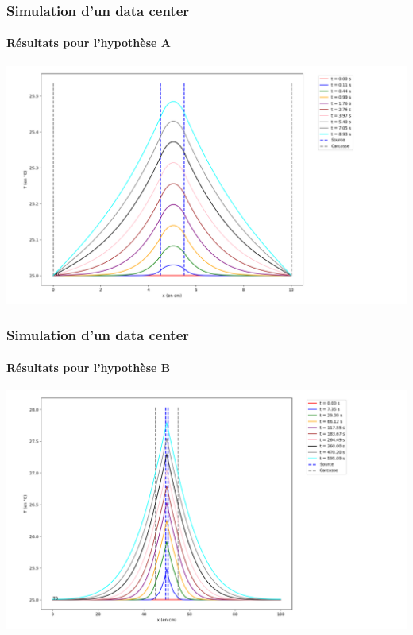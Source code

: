 \documentclass[a4paper,11pt]{beamer}
\begin{document}
\begin{frame}
    \frametitle{Simulation d'un data center}
    \framesubtitle{Résultats pour l'hypothèse A}

    \includegraphics[width=\textwidth]{hypA_C1.67.png}
\end{frame}

\begin{frame}
    \frametitle{Simulation d'un data center}
    \framesubtitle{Résultats pour l'hypothèse B}

    \includegraphics[width=\textwidth]{hypB_C1.67.png}
\end{frame}

\end{document}
